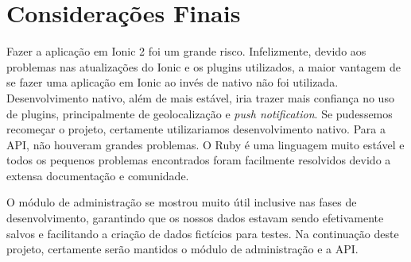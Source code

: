 \section{Considerações Finais}
Fazer a aplicação em Ionic 2 foi um grande risco. Infelizmente, devido aos problemas nas atualizações do Ionic e os plugins utilizados, a maior vantagem de se fazer uma aplicação em Ionic ao invés de nativo não foi utilizada. Desenvolvimento nativo, além de mais estável, iria trazer mais confiança no uso de plugins, principalmente de geolocalização e \textit{push notification}. Se pudessemos recomeçar o projeto, certamente utilizariamos desenvolvimento nativo. Para a API, não houveram grandes problemas. O Ruby é uma linguagem muito estável e todos os pequenos problemas encontrados foram facilmente resolvidos devido a extensa documentação e comunidade. 

O módulo de administração se mostrou muito útil inclusive nas fases de desenvolvimento, garantindo que os nossos dados estavam sendo efetivamente salvos e facilitando a criação de dados fictícios para testes. Na continuação deste projeto, certamente serão mantidos o módulo de administração e a API.

